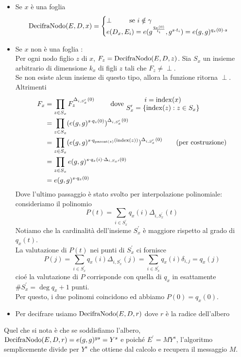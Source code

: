 \begin{description}
\begin{itemize}
\item Se $x$ è una foglia
\[ \operatorname{DecifraNodo}(E,D,x) = \begin{cases}
\perp \qquad \text{ se } i \notin \gamma\\
e(D_x,E_i) = e(g^{\frac{q_x(0)}{t_i}},g^{s\cdot t_i}) = e(g,g)^{q_x(0) \cdot s}
\end{cases} \]
\item Se $x$ non è una foglia :\\
Per ogni nodo figlio $z$ di $x$, $F_z = \operatorname{DecifraNodo}(E,D,z)$. Sia $S_x$\label{insiemedecript} un insieme arbitrario di dimensione $k_x$ di figli $z$ tali che $F_z \neq \perp$.\\
Se non esiste alcun insieme di questo tipo, allora la funzione ritorna $\perp$.\\
Altrimenti
\begin{align*}
F_x &= \prod_{z \in S_x} F_z^{\Delta_{i,S_x^\prime}(0)} \qquad \text{ dove }
\begin{matrix}
i = \operatorname{index}(x)\\
S^\prime_x = \{ \operatorname{index}(z) : z \in S_x \}
\end{matrix}\\
&= \prod_{z \in S_x} (e(g,g)^{s \cdot q_z(0)})^{\Delta_{i,S_x^\prime}(0)}\\
&= \prod_{z \in S_x} (e(g,g)^{s \cdot q_{\operatorname{parent}(z)}(\operatorname{index}(z))})^{\Delta_{i,S_x^\prime}(0)} \qquad \text{(per costruzione)}\\
&= \prod_{z \in S_x} e(g,g)^{s \cdot q_x(i) \cdot \Delta_{i,S_x\prime}(0)}\\
&= e(g,g)^{s \cdot q_x(0)} 
\end{align*}
Dove l'ultimo passaggio è stato svolto per interpolazione polinomiale:\\
consideriamo il polinomio
\[ P(t) = \sum_{i \in S^\prime_x} q_x(i) \Delta_{i,S^\prime_x}(t)\]
Notiamo che la cardinalità dell'insieme $ S^\prime_x$ è maggiore rispetto al grado di $q_x(t)$.\\
La valutazione di $P(t)$ nei punti di $S^\prime_x$ ci fornisce 
\[P(j) = \sum_{i \in S^\prime_x} q_x(i) \Delta_{i,S^\prime_x}(j) = \sum_{i \in S^\prime_x} q_x(i) \delta_{i,j} = q_x(j)\]
cioé la valutazione di $P$ corrisponde con quella di $q_x$ in esattamente $\# S^\prime_x = \deg q_x + 1$ punti.\\
Per questo, i due polinomi coincidono ed abbiamo $P(0) = q_x(0)$.

\item Per decifrare usiamo $\operatorname{DecifraNodo} (E,D,r)$ dove $r$ è la radice dell'albero
\end{itemize}
Quel che si nota è che se soddisfiamo l'albero, $\operatorname{DecifraNodo} (E,D,r) = e(g,g)^{ys} = Y^s$ e poiché $E^\prime = MY^s$, l'algoritmo semplicemente divide per $Y^s$ che ottiene dal calcolo e recupera il messaggio $M$.
\end{description}


